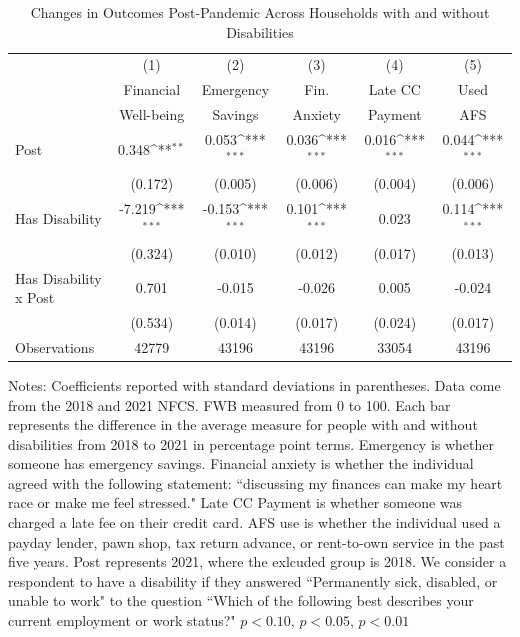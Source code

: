 \documentclass[12pt]{article}
\begin{document}
\begin{table}\label{NFCS_regs}
\caption{Changes in Outcomes Post-Pandemic Across Households with and without Disabilities}
{
\def\sym#1{\ifmmode^{#1}\else\(^{#1}\)\fi}
\begin{tabular}{l*{5}{c}}
\hline\hline
                    &\multicolumn{1}{c}{(1)}&\multicolumn{1}{c}{(2)}&\multicolumn{1}{c}{(3)}&\multicolumn{1}{c}{(4)}&\multicolumn{1}{c}{(5)}\\
                    &\multicolumn{1}{c}{Financial }&\multicolumn{1}{c}{Emergency }&\multicolumn{1}{c}{Fin. }&\multicolumn{1}{c}{Late CC }&\multicolumn{1}{c}{Used }\\ &\multicolumn{1}{c}{ Well-being}&\multicolumn{1}{c}{ Savings}&\multicolumn{1}{c}{ Anxiety}&\multicolumn{1}{c}{ Payment}&\multicolumn{1}{c}{AFS}\\
\hline
Post                &       0.348\sym{**} &       0.053\sym{***}&       0.036\sym{***}&       0.016\sym{***}&       0.044\sym{***}\\
                    &     (0.172)         &     (0.005)         &     (0.006)         &     (0.004)         &     (0.006)         \\
[1em]
Has Disability      &      -7.219\sym{***}&      -0.153\sym{***}&       0.101\sym{***}&       0.023         &       0.114\sym{***}\\
                    &     (0.324)         &     (0.010)         &     (0.012)         &     (0.017)         &     (0.013)         \\
[1em]
Has Disability x Post&       0.701         &      -0.015         &      -0.026         &       0.005         &      -0.024         \\
                    &     (0.534)         &     (0.014)         &     (0.017)         &     (0.024)         &     (0.017)         \\
\hline
Observations        &       42779         &       43196         &       43196         &       33054         &       43196         \\
\hline\hline
\end{tabular}
}
\medskip 
\begin{minipage}{0.85\textwidth} 
{\footnotesize Notes: Coefficients reported with standard deviations in parentheses. Data come from the 2018 and 2021 NFCS. FWB measured from 0 to 100. Each bar represents the difference in the average measure for people with and without disabilities from 2018 to 2021 in percentage point terms. Emergency is whether someone has emergency savings. Financial anxiety is whether the individual agreed with the following statement: ``discussing my finances can make my heart race or make me feel stressed." Late CC Payment is whether someone was charged a late fee on their credit card. AFS use is whether the individual used a payday lender, pawn shop, tax return advance, or rent-to-own service in the past five years. Post represents 2021, where the exlcuded group is 2018. We consider a respondent to have a disability if they answered ``Permanently sick, disabled, or unable to work" to the question ``Which of the following best describes your current employment or work status?" \sym{*} \(p<0.10\), \sym{**} \(p<0.05\), \sym{***} \(p<0.01\) \par}

\end{minipage}
\end{table}
\end{document}
